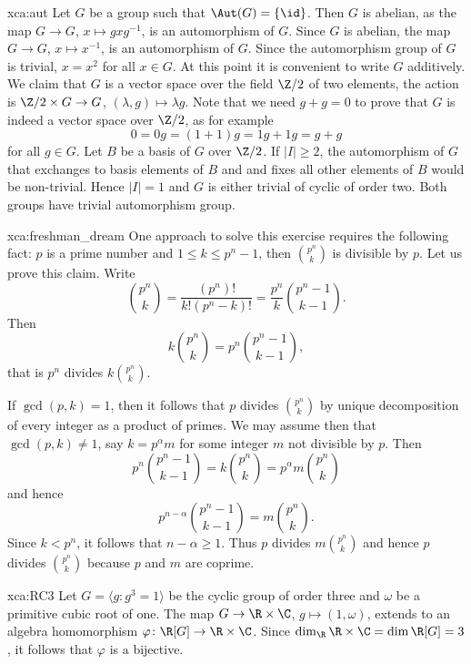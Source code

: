 \begin{sol}{xca:aut}
    Let $G$ be a group such that $\Aut(G)=\{\id\}$. 
    Then $G$ is abelian, as the map $G\to G$, $x\mapsto gxg^{-1}$,   
    is an automorphism of $G$. Since $G$ is abelian, 
    the map $G\to G$, $x\mapsto x^{-1}$, is an automorphism of $G$. Since 
    the automorphism group of $G$ is trivial, 
    $x=x^2$ for all $x\in G$. 
    At this point it is convenient to write $G$ additively. We claim that 
    $G$ is a vector space
    over the field $\Z/2$ of two elements, the action
    is $\Z/2\times G\to G$, $(\lambda,g)\mapsto \lambda g$. Note that
    we need $g+g=0$ to prove that $G$ is indeed a vector space over $\Z/2$, as for example
    \[
    0=0g=(1+1)g=1g+1g=g+g
    \]
    for all $g\in G$. 
    Let $B$ be   
    a basis of $G$ over $\Z/2$. If $|I|\geq 2$, 
    the automorphism of $G$ that exchanges to basis elements of $B$ and  
    and fixes all other elements of $B$ would be non-trivial. Hence $|I|=1$ and 
    $G$ is either trivial of cyclic of order two. Both groups have trivial
    automorphism group. 
\end{sol}


\begin{sol}{xca:freshman_dream}
    One approach to solve this exercise requires the following fact: 
    $p$ is a prime number and $1\leq k\leq p^n-1$, then $\binom{p^n}{k}$ is divisible by $p$.
    Let us prove this claim. Write
    \[
    \binom{p^n}{k}=\frac{(p^n)!}{k!(p^n-k)!}=\frac{p^n}{k}\binom{p^n-1}{k-1}.
    \]
    Then
    \[
    k\binom{p^n}{k}=p^n\binom{p^n-1}{k-1},
    \]
    that is $p^n$ divides $k\binom{p^n}{k}$. 
    
    If $\gcd(p,k)=1$, then it follows that $p$ divides $\binom{p^n}{k}$ by unique decomposition
    of every integer as a product of primes. We may assume then that $\gcd(p,k)\ne1$, 
    say $k=p^\alpha m$ for some integer $m$ not divisible by $p$. Then
    \[
    p^n\binom{p^n-1}{k-1}=k\binom{p^n}{k}=p^{\alpha}m\binom{p^n}{k}
    \]
    and hence 
    \[
    p^{n-\alpha}\binom{p^n-1}{k-1}=m\binom{p^n}{k}.
    \]
    Since $k<p^n$, it follows that
    $n-\alpha\geq 1$. Thus $p$ divides $m\binom{p^n}{k}$ and hence
    $p$ divides $\binom{p^n}{k}$ because $p$ and $m$ are coprime. 
\end{sol}


\begin{sol}{xca:RC3}
Let $G=\langle g:g^3=1\rangle$ be the cyclic group of order three and $\omega$ be a primitive cubic root of one.  
The map $G\to \R\times\C$, $g\mapsto (1,\omega)$, extends to an algebra
homomorphism $\varphi\colon\R[G]\to\R\times\C$. Since 
$\dim_\R\R\times\C=\dim\R[G]=3$, it follows that $\varphi$ is a bijective. 
\end{sol}


